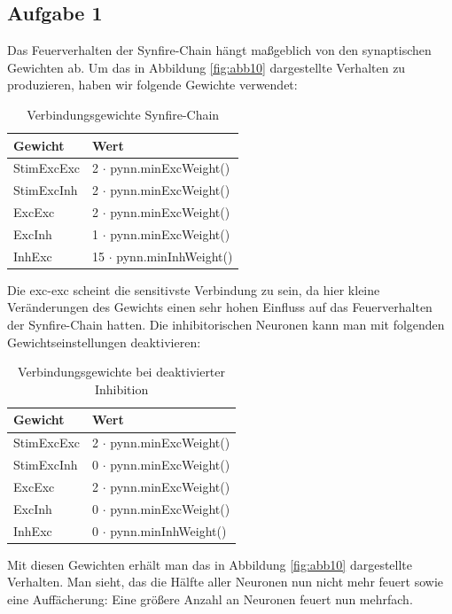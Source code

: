 \documentclass[10pt,a4paper]{scrartcl}
\begin{document}
\subsection{Aufgabe 1}
Das Feuerverhalten der Synfire-Chain hängt maßgeblich von den synaptischen Gewichten ab. Um das in Abbildung \ref{fig:abb10} dargestellte Verhalten zu produzieren, haben wir folgende Gewichte verwendet:

\begin{table}[H]
\centering
\captionsetup{justification=centering}
\caption{Verbindungsgewichte Synfire-Chain}
\begin{tabular}{l|l}
 Gewicht&Wert\\
\hline
StimExcExc&2 $\cdot$ pynn.minExcWeight()\\
StimExcInh&2 $\cdot$ pynn.minExcWeight()\\
ExcExc&2 $\cdot$ pynn.minExcWeight()\\
ExcInh&1 $\cdot$ pynn.minExcWeight()\\
InhExc&15 $\cdot$ pynn.minInhWeight()
\end{tabular}
\label{tab:05}
\end{table}

\noindent Die exc-exc scheint die sensitivste Verbindung zu sein, da hier kleine Veränderungen des Gewichts einen sehr hohen Einfluss auf das Feuerverhalten der Synfire-Chain hatten. Die inhibitorischen Neuronen kann man mit folgenden Gewichtseinstellungen deaktivieren:

\begin{table}[H]
\centering
\captionsetup{justification=centering}
\caption{Verbindungsgewichte bei deaktivierter Inhibition}
\begin{tabular}{l|l}
 Gewicht&Wert\\
\hline
StimExcExc&2 $\cdot$ pynn.minExcWeight()\\
StimExcInh&0 $\cdot$ pynn.minExcWeight()\\
ExcExc&2 $\cdot$ pynn.minExcWeight()\\
ExcInh&0 $\cdot$ pynn.minExcWeight()\\
InhExc&0 $\cdot$ pynn.minInhWeight()
\end{tabular}
\label{tab:06}
\end{table}

\noindent Mit diesen Gewichten erhält man das in Abbildung \ref{fig:abb10} dargestellte Verhalten. Man sieht, das die Hälfte aller Neuronen nun nicht mehr feuert sowie eine Auffächerung: Eine größere Anzahl an Neuronen feuert nun mehrfach.
\end{document}
